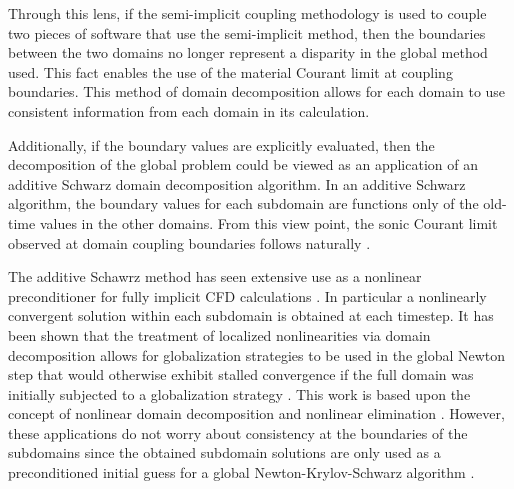 Through this lens, if the semi-implicit coupling methodology is used to couple two pieces of software that use the semi-implicit method, then the boundaries between the two domains no longer represent a disparity in the global method used.
This fact enables the use of the material Courant limit at coupling boundaries.
This method of domain decomposition allows for each domain to use consistent information from each domain in its calculation.

Additionally, if the boundary values are explicitly evaluated, then the decomposition of the global problem could be viewed as an application of an additive Schwarz domain decomposition algorithm.
In an additive Schwarz algorithm, the boundary values for each subdomain are functions only of the old-time values in the other domains.
From this view point, the sonic Courant limit observed at domain coupling boundaries follows naturally \cite{Aumiller2001}.

The additive Schawrz method has seen extensive use as a nonlinear preconditioner for fully implicit CFD calculations \cite{Cai2009, Cai2002}.
In particular a nonlinearly convergent solution within each subdomain is obtained at each timestep.
It has been shown that the treatment of localized nonlinearities via domain decomposition allows for globalization strategies to be used in the global Newton step that would otherwise exhibit stalled convergence if the full domain was initially subjected to a globalization strategy \cite{Cai2011}.
This work is based upon the concept of nonlinear domain decomposition and nonlinear elimination \cite{Lanzkron1996, Dryja1997}.
However, these applications do not worry about consistency at the boundaries of the subdomains since the obtained subdomain solutions are only used as a preconditioned initial guess for a global Newton-Krylov-Schwarz algorithm \cite{Chan1984}.


